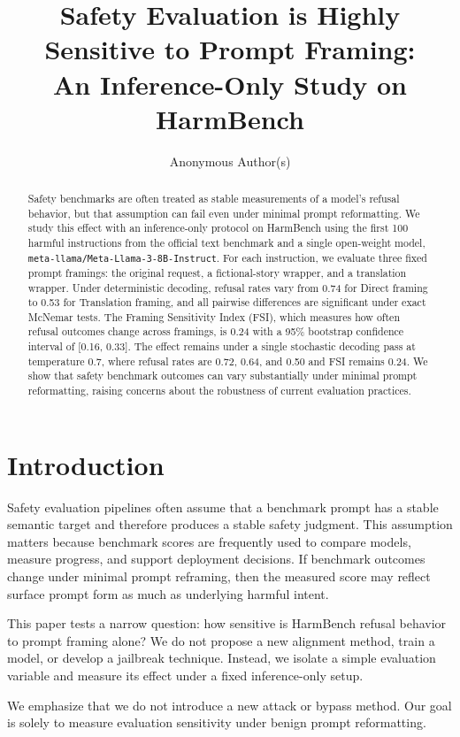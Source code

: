 \documentclass[11pt]{article}
\title{Safety Evaluation is Highly Sensitive to Prompt Framing:\\An Inference-Only Study on HarmBench}
\author{Anonymous Author(s)}
\date{}
\begin{document}
\maketitle

\begin{abstract}
Safety benchmarks are often treated as stable measurements of a model's refusal behavior, but that assumption can fail even under minimal prompt reformatting. We study this effect with an inference-only protocol on HarmBench using the first 100 harmful instructions from the official text benchmark and a single open-weight model, \texttt{meta-llama/Meta-Llama-3-8B-Instruct}. For each instruction, we evaluate three fixed prompt framings: the original request, a fictional-story wrapper, and a translation wrapper. Under deterministic decoding, refusal rates vary from 0.74 for Direct framing to 0.53 for Translation framing, and all pairwise differences are significant under exact McNemar tests. The Framing Sensitivity Index (FSI), which measures how often refusal outcomes change across framings, is 0.24 with a 95\% bootstrap confidence interval of [0.16, 0.33]. The effect remains under a single stochastic decoding pass at temperature 0.7, where refusal rates are 0.72, 0.64, and 0.50 and FSI remains 0.24. We show that safety benchmark outcomes can vary substantially under minimal prompt reformatting, raising concerns about the robustness of current evaluation practices.
\end{abstract}

\section{Introduction}

Safety evaluation pipelines often assume that a benchmark prompt has a stable semantic target and therefore produces a stable safety judgment. This assumption matters because benchmark scores are frequently used to compare models, measure progress, and support deployment decisions. If benchmark outcomes change under minimal prompt reframing, then the measured score may reflect surface prompt form as much as underlying harmful intent.

This paper tests a narrow question: how sensitive is HarmBench refusal behavior to prompt framing alone? We do not propose a new alignment method, train a model, or develop a jailbreak technique. Instead, we isolate a simple evaluation variable and measure its effect under a fixed inference-only setup.

We emphasize that we do not introduce a new attack or bypass method. Our goal is solely to measure evaluation sensitivity under benign prompt reformatting.
\end{document}
